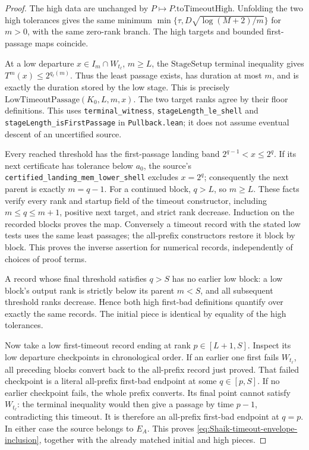 \begin{proof}
The high data are unchanged by \(P\mapsto P.\mathrm{toTimeoutHigh}\).
Unfolding the two high tolerances gives the same minimum
\(\min\{\tau,D\sqrt{\log(M+2)/m}\}\) for \(m>0\), with the same
zero-rank branch. The high targets and bounded first-passage maps coincide.

At a low departure \(x\in I_m\cap W_{t_\ell}\), \(m\ge L\), the
\(\mathrm{StageSetup}\) terminal inequality gives
\(T^m(x)\le2^{q_\ell(m)}\). Thus the least passage exists, has duration
at most \(m\), and is exactly the duration stored by the low stage.
This is precisely \(\mathrm{LowTimeoutPassage}(K_0,L,m,x)\).
The two target ranks agree by their floor definitions. This uses
\texttt{terminal\_witness}, \texttt{stageLength\_le\_shell} and
\texttt{stageLength\_isFirstPassage} in \texttt{Pullback.lean};
it does not assume eventual descent of an uncertified source.

Every reached threshold has the first-passage landing band
\(2^{q-1}<x\le2^q\). If its next certificate has tolerance below \(a_0\),
the source's \texttt{certified\_landing\_mem\_lower\_shell} excludes
\(x=2^q\); consequently the next parent is exactly \(m=q-1\).
For a continued block, \(q>L\), so \(m\ge L\). These facts verify
every rank and startup field of the timeout constructor, including
\(m\le q\le m+1\), positive next target, and strict rank decrease.
Induction on the recorded blocks proves the map. Conversely a timeout
record with the stated low tests uses the same least passages; the
all-prefix constructors restore it block by block. This proves the
inverse assertion for numerical records, independently of choices of
proof terms.

A record whose final threshold satisfies \(q>S\) has no earlier low
block: a low block's output rank is strictly below its parent \(m<S\),
and all subsequent threshold ranks decrease. Hence both high first-bad
definitions quantify over exactly the same records. The initial piece
is identical by equality of the high tolerances.

Now take a low first-timeout record ending at rank \(p\in[L+1,S]\).
Inspect its low departure checkpoints in chronological order.
If an earlier one first fails \(W_{t_\ell}\), all preceding blocks
convert back to the all-prefix record just proved. That failed
checkpoint is a literal all-prefix first-bad endpoint at some
\(q\in[p,S]\). If no earlier checkpoint fails, the whole prefix converts.
Its final point cannot satisfy \(W_{t_\ell}\): the terminal inequality
would then give a passage by time \(p-1\), contradicting this timeout.
It is therefore an all-prefix first-bad endpoint at \(q=p\).
In either case the source belongs to \(E_A\). This proves
\eqref{eq:Shaik-timeout-envelope-inclusion}, together with the already
matched initial and high pieces.


\end{proof}

